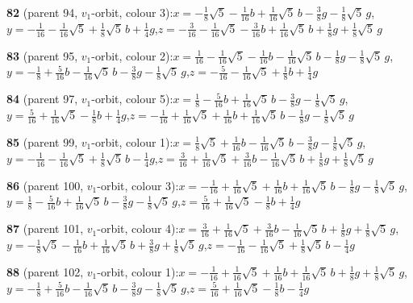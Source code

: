 \documentclass[10pt]{article}
\begin{document}
{\noindent\textbf{82} (parent 94, $v_1$-orbit, colour 3):\quad $x=-\tfrac{1}{8}\sqrt5-\tfrac{1}{16}b+\tfrac{1}{16}\sqrt5\,b-\tfrac{3}{8}g-\tfrac{1}{8}\sqrt5\,g$,\quad $y=-\tfrac{1}{16}-\tfrac{1}{16}\sqrt5+\tfrac{1}{8}\sqrt5\,b+\tfrac{1}{4}g$,\quad $z=-\tfrac{3}{16}-\tfrac{1}{16}\sqrt5-\tfrac{3}{16}b+\tfrac{1}{16}\sqrt5\,b+\tfrac{1}{8}g+\tfrac{1}{8}\sqrt5\,g$\par\smallskip
\noindent\textbf{83} (parent 95, $v_1$-orbit, colour 2):\quad $x=\tfrac{1}{16}-\tfrac{1}{16}\sqrt5-\tfrac{1}{16}b-\tfrac{1}{16}\sqrt5\,b-\tfrac{1}{8}g-\tfrac{1}{8}\sqrt5\,g$,\quad $y=-\tfrac{1}{8}+\tfrac{5}{16}b-\tfrac{1}{16}\sqrt5\,b-\tfrac{3}{8}g-\tfrac{1}{8}\sqrt5\,g$,\quad $z=-\tfrac{5}{16}-\tfrac{1}{16}\sqrt5+\tfrac{1}{8}b+\tfrac{1}{4}g$\par\smallskip
\noindent\textbf{84} (parent 97, $v_1$-orbit, colour 5):\quad $x=\tfrac{1}{8}-\tfrac{5}{16}b+\tfrac{1}{16}\sqrt5\,b-\tfrac{3}{8}g-\tfrac{1}{8}\sqrt5\,g$,\quad $y=\tfrac{5}{16}+\tfrac{1}{16}\sqrt5-\tfrac{1}{8}b+\tfrac{1}{4}g$,\quad $z=-\tfrac{1}{16}+\tfrac{1}{16}\sqrt5+\tfrac{1}{16}b+\tfrac{1}{16}\sqrt5\,b-\tfrac{1}{8}g-\tfrac{1}{8}\sqrt5\,g$\par\smallskip
\noindent\textbf{85} (parent 99, $v_1$-orbit, colour 1):\quad $x=\tfrac{1}{8}\sqrt5+\tfrac{1}{16}b-\tfrac{1}{16}\sqrt5\,b-\tfrac{3}{8}g-\tfrac{1}{8}\sqrt5\,g$,\quad $y=-\tfrac{1}{16}-\tfrac{1}{16}\sqrt5+\tfrac{1}{8}\sqrt5\,b-\tfrac{1}{4}g$,\quad $z=\tfrac{3}{16}+\tfrac{1}{16}\sqrt5+\tfrac{3}{16}b-\tfrac{1}{16}\sqrt5\,b+\tfrac{1}{8}g+\tfrac{1}{8}\sqrt5\,g$\par\smallskip
\noindent\textbf{86} (parent 100, $v_1$-orbit, colour 3):\quad $x=-\tfrac{1}{16}+\tfrac{1}{16}\sqrt5+\tfrac{1}{16}b+\tfrac{1}{16}\sqrt5\,b-\tfrac{1}{8}g-\tfrac{1}{8}\sqrt5\,g$,\quad $y=\tfrac{1}{8}-\tfrac{5}{16}b+\tfrac{1}{16}\sqrt5\,b-\tfrac{3}{8}g-\tfrac{1}{8}\sqrt5\,g$,\quad $z=\tfrac{5}{16}+\tfrac{1}{16}\sqrt5-\tfrac{1}{8}b+\tfrac{1}{4}g$\par\smallskip
\noindent\textbf{87} (parent 101, $v_1$-orbit, colour 4):\quad $x=\tfrac{3}{16}+\tfrac{1}{16}\sqrt5+\tfrac{3}{16}b-\tfrac{1}{16}\sqrt5\,b+\tfrac{1}{8}g+\tfrac{1}{8}\sqrt5\,g$,\quad $y=-\tfrac{1}{8}\sqrt5-\tfrac{1}{16}b+\tfrac{1}{16}\sqrt5\,b+\tfrac{3}{8}g+\tfrac{1}{8}\sqrt5\,g$,\quad $z=-\tfrac{1}{16}-\tfrac{1}{16}\sqrt5+\tfrac{1}{8}\sqrt5\,b-\tfrac{1}{4}g$\par\smallskip
\noindent\textbf{88} (parent 102, $v_1$-orbit, colour 1):\quad $x=-\tfrac{1}{16}+\tfrac{1}{16}\sqrt5+\tfrac{1}{16}b+\tfrac{1}{16}\sqrt5\,b+\tfrac{1}{8}g+\tfrac{1}{8}\sqrt5\,g$,\quad $y=-\tfrac{1}{8}+\tfrac{5}{16}b-\tfrac{1}{16}\sqrt5\,b-\tfrac{3}{8}g-\tfrac{1}{8}\sqrt5\,g$,\quad $z=\tfrac{5}{16}+\tfrac{1}{16}\sqrt5-\tfrac{1}{8}b-\tfrac{1}{4}g$\par\smallskip
}
\end{document}

